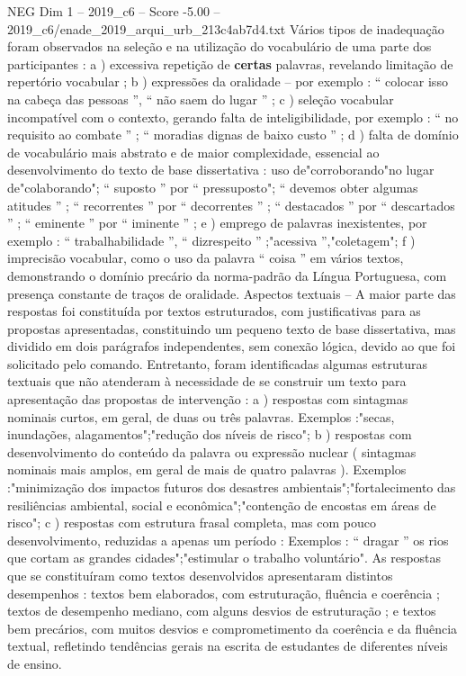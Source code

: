 \begin{textsample}{NEG Dim 1 – 2019\_c6 – Score -5.00 – 2019\_c6/enade\_2019\_arqui\_urb\_213c4ab7d4.txt}
Vários tipos de inadequação foram observados na seleção e na utilização do vocabulário de uma parte dos participantes : a ) excessiva repetição de \textbf{certas} palavras, revelando limitação de repertório vocabular ; b ) expressões da oralidade – por exemplo : “ colocar isso na cabeça das pessoas ”, “ não saem do lugar ” ; c ) seleção vocabular incompatível com o contexto, gerando falta de inteligibilidade, por exemplo : “ no requisito ao combate ” ; “ moradias dignas de baixo custo ” ; d ) falta de domínio de vocabulário mais abstrato e de maior complexidade, essencial ao desenvolvimento do texto de base dissertativa : uso de"corroborando"no lugar de"colaborando"; “ suposto ” por “ pressuposto"; “ devemos obter algumas atitudes ” ; “ recorrentes ” por “ decorrentes ” ; “ destacados ” por “ descartados ” ; “ eminente ” por “ iminente ” ; e ) emprego de palavras inexistentes, por exemplo : “ trabalhabilidade ”, “ dizrespeito ” ;"acessiva ”,"coletagem"; f ) imprecisão vocabular, como o uso da palavra “ coisa ” em vários textos, demonstrando o domínio precário da norma-padrão da Língua Portuguesa, com presença constante de traços de oralidade.
Aspectos textuais – A maior parte das respostas foi constituída por textos estruturados, com justificativas para as propostas apresentadas, constituindo um pequeno texto de base dissertativa, mas dividido em dois parágrafos independentes, sem conexão lógica, devido ao que foi solicitado pelo comando.
Entretanto, foram identificadas algumas estruturas textuais que não atenderam à necessidade de se construir um texto para apresentação das propostas de intervenção : a ) respostas com sintagmas nominais curtos, em geral, de duas ou três palavras.
Exemplos :"secas, inundações, alagamentos";"redução dos níveis de risco"; b ) respostas com desenvolvimento do conteúdo da palavra ou expressão nuclear ( sintagmas nominais mais amplos, em geral de mais de quatro palavras ).
Exemplos :"minimização dos impactos futuros dos desastres ambientais";"fortalecimento das resiliências ambiental, social e econômica";"contenção de encostas em áreas de risco"; c ) respostas com estrutura frasal completa, mas com pouco desenvolvimento, reduzidas a apenas um período : Exemplos : “ dragar ” os rios que cortam as grandes cidades";"estimular o trabalho voluntário".
As respostas que se constituíram como textos desenvolvidos apresentaram distintos desempenhos : textos bem elaborados, com estruturação, fluência e coerência ; textos de desempenho mediano, com alguns desvios de estruturação ; e textos bem precários, com muitos desvios e comprometimento da coerência e da fluência textual, refletindo tendências gerais na escrita de estudantes de diferentes níveis de ensino.

\end{textsample}
